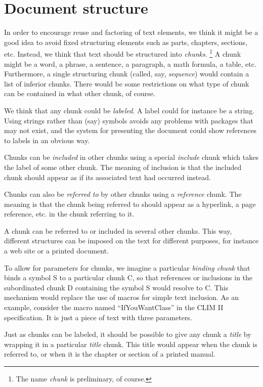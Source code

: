 \chapter{Document structure}
\label{chap-document-structure}

In order to encourage reuse and factoring of text elements, we think
it might be a good idea to avoid fixed structuring elements such as
parts, chapters, sections, etc.  Instead, we think that text should be
structured into \emph{chunks}.%
\footnote{The name \emph{chunk} is preliminary, of course.}
A chunk might be a word, a phrase, a sentence, a paragraph, a math
formula, a table, etc.  Furthermore, a single structuring chunk
(called, say, \emph{sequence}) would contain a list of inferior
chunks.  There would be some restrictions on what type of chunk can be
contained in what other chunk, of course.  

We think that any chunk could be \emph{labeled}.  A label could for
instance be a \commonlisp{} string.  Using strings rather than (say)
symbols avoids any problems with packages that may not exist, and the
system for presenting the document could show references to labels in
an obvious way.

Chunks can be \emph{included} in other chunks using a special
\emph{include} chunk which takes the label of some other chunk.
The meaning of inclusion is that the included chunk should appear as
if its associated text had occurred instead.  

Chunks can also be \emph{referred to} by other chunks using a
\emph{reference} chunk.  The meaning is that the chunk being referred
to should appear as a hyperlink, a page reference, etc. in the chunk
referring to it. 

A chunk can be referred to or included in several other chunks.  This
way, different structures can be imposed on the text for different
purposes, for instance a web site or a printed document. 

To allow for parameters for chunks, we imagine a particular
\emph{binding chunk} that binds a symbol S to a particular chunk C, so
that references or inclusions in the subordinated chunk D containing
the symbol S would resolve to C.  This mechanism would replace the use
of macros for simple text inclusion.  As an example, consider the
macro named ``IfYouWantClass'' in the CLIM II specification.  It is
just a piece of text with three parameters. 

Just as chunks can be labeled, it should be possible to give any chunk
a \emph{title} by wrapping it in a particular \emph{title} chunk.
This title would appear when the chunk is referred to, or when it is
the chapter or section of a printed manual.

